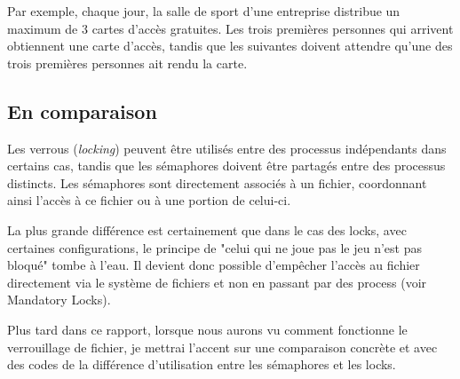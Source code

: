 Par exemple, chaque jour, la salle de sport d'une entreprise distribue un maximum de 3 cartes d'accès gratuites. Les trois premières personnes qui arrivent obtiennent une carte d'accès, tandis que les suivantes doivent attendre qu'une des trois premières personnes ait rendu la carte.

\subsection{En comparaison}
Les verrous (\textit{locking}) peuvent être utilisés entre des processus indépendants dans certains cas, tandis que les sémaphores doivent être partagés entre des processus distincts. Les sémaphores sont directement associés à un fichier, coordonnant ainsi l'accès à ce fichier ou à une portion de celui-ci.

La plus grande différence est certainement que dans le cas des locks, avec certaines configurations, le principe de "celui qui ne joue pas le jeu n'est pas bloqué" tombe à l'eau. Il devient donc possible d'empêcher l'accès au fichier directement via le système de fichiers et non en passant par des process (voir Mandatory Locks).
\newline

Plus tard dans ce rapport, lorsque nous aurons vu comment fonctionne le verrouillage de fichier, je mettrai l'accent sur une comparaison concrète et avec des codes de la différence d'utilisation entre les sémaphores et les locks.